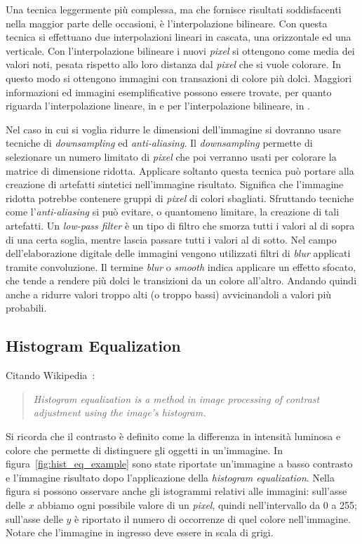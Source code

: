 Una tecnica leggermente più complessa, ma che fornisce risultati soddisfacenti nella maggior parte delle occasioni, è l'interpolazione bilineare.
Con questa tecnica si effettuano due interpolazioni lineari in cascata, una orizzontale ed una verticale.
Con l'interpolazione bilineare i nuovi \textit{pixel} si ottengono come media dei valori noti, pesata rispetto allo loro distanza dal \textit{pixel} che si vuole colorare.
In questo modo si ottengono immagini con transazioni di colore più dolci.
Maggiori informazioni ed immagini esemplificative possono essere trovate, per quanto riguarda l'interpolazione lineare, in \cite{linear-interpolation} e per l'interpolazione bilineare, in \cite{bilinear-interpolation}.

Nel caso in cui si voglia ridurre le dimensioni dell'immagine si dovranno usare tecniche di \textit{downsampling} ed \textit{anti-aliasing}.
Il \textit{downsampling} permette di selezionare un numero limitato di \textit{pixel} che poi verranno usati per colorare la matrice di dimensione ridotta.
Applicare soltanto questa tecnica può portare alla creazione di artefatti sintetici nell'immagine risultato.
Significa che l'immagine ridotta potrebbe contenere gruppi di \textit{pixel} di colori sbagliati.
Sfruttando tecniche come l'\textit{anti-aliasing} si può evitare, o quantomeno limitare, la creazione di tali artefatti.
Un \textit{low-pass filter} è un tipo di filtro che smorza tutti i valori al di sopra di una certa soglia, mentre lascia passare tutti i valori al di sotto.
Nel campo dell'elaborazione digitale delle immagini vengono utilizzati filtri di \textit{blur} applicati tramite convoluzione.
Il termine \textit{blur} o \textit{smooth} indica applicare un effetto sfocato, che tende a rendere più dolci le transizioni da un colore all'altro.
Andando quindi anche a ridurre valori troppo alti (o troppo bassi) avvicinandoli a valori più probabili.


\clearpage
\subsection {Histogram Equalization}
Citando Wikipedia~\cite{wikipedia-hist-eq}:
\begin{quote}
  \textit{Histogram equalization is a method in image processing of contrast adjustment using the image's histogram.}
\end{quote}
Si ricorda che il contrasto è definito come la differenza in intensità luminosa e colore che permette di distinguere gli oggetti in un'immagine.
In figura~\ref{fig:hist_eq_example} sono state riportate un'immagine a basso contrasto e l'immagine risultato dopo l'applicazione della \textit{histogram equalization}.
Nella figura si possono osservare anche gli istogrammi relativi alle immagini: sull'asse delle $x$ abbiamo ogni possibile valore di un \textit{pixel}, quindi nell'intervallo da 0 a 255; sull'asse delle $y$ è riportato il numero di occorrenze di quel colore nell'immagine.
Notare che l'immagine in ingresso deve essere in scala di grigi.

